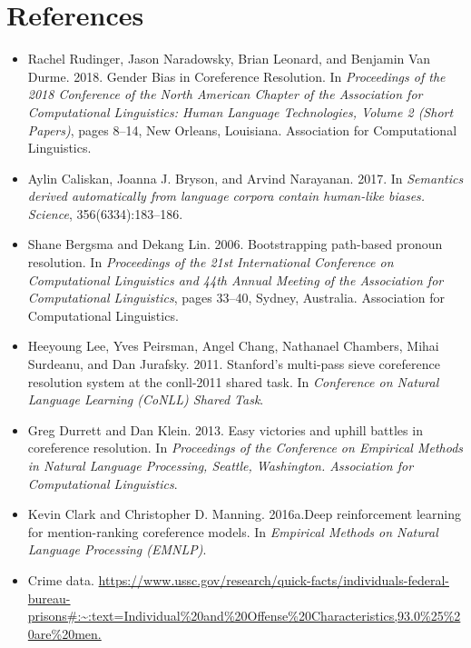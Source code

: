 \documentclass[11pt]{article}
\begin{document}
\section*{References} 
\begin{itemize}
    \item Rachel Rudinger, Jason Naradowsky, Brian Leonard, and Benjamin Van Durme. 2018. Gender Bias in Coreference Resolution. In \textit{Proceedings of the 2018 Conference of the North American Chapter of the Association for Computational Linguistics: Human Language Technologies, Volume 2 (Short Papers)}, pages 8–14, New Orleans, Louisiana. Association for Computational Linguistics.
    \item Aylin Caliskan, Joanna J. Bryson, and Arvind Narayanan. 2017. In \textit{Semantics derived automatically from language corpora contain human-like biases. Science}, 356(6334):183–186.
    \item Shane Bergsma and Dekang Lin. 2006. Bootstrapping path-based pronoun resolution. In \textit{Proceedings of the 21st International Conference on Computational Linguistics and 44th Annual Meeting of the Association for Computational Linguistics}, pages 33–40, Sydney, Australia. Association for Computational Linguistics.
    \item Heeyoung Lee, Yves Peirsman, Angel Chang, Nathanael Chambers, Mihai Surdeanu, and Dan Jurafsky. 2011. Stanford’s multi-pass sieve coreference resolution system at the conll-2011 shared task. In \textit{Conference on Natural Language Learning (CoNLL) Shared Task}.
    \item Greg Durrett and Dan Klein. 2013. Easy victories and uphill battles in coreference resolution. In \textit{Proceedings of the Conference on Empirical Methods in Natural Language Processing, Seattle, Washington. Association for Computational Linguistics}.
    \item Kevin Clark and Christopher D. Manning. 2016a.Deep reinforcement learning for mention-ranking coreference models. In \textit{Empirical Methods on Natural Language Processing (EMNLP)}.
    \item Crime data. \url{https://www.ussc.gov/research/quick-facts/individuals-federal-bureau-prisons#:~:text=Individual%20and%20Offense%20Characteristics,93.0%25%20are%20men.}
\end{itemize}
\end{document}
